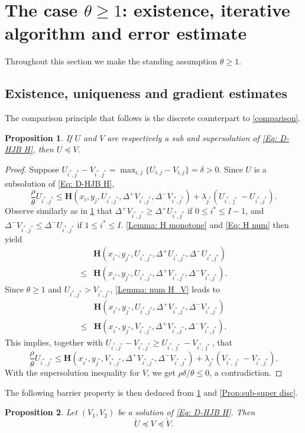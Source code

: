 \documentclass[11pt]{article}
\numberwithin{equation}{section}
\numberwithin{algorithm}{section}
\newtheorem{proposition}[proposition]{Proposition}
\newcommand{\lc}{\left(}
\newcommand{\rc}{\right)}
\newcommand{\beq}{\begin{equation}}
\newcommand{\eeq}{\end{equation}}
\theoremstyle{plain}
\newcommand{\D}{\Delta}
\begin{document}
\section{The case $\theta \geq 1$: existence, iterative algorithm and error estimate}\label{Sec: late}
Throughout this section we make the standing assumption $\theta \geq 1$.
\subsection{Existence, uniqueness and gradient estimates}
The comparison principle that follows is the discrete counterpart to \cref{comparison}. 
\begin{proposition}\label{Prop: comparison}
If ${U}$ and ${V}$ are respectively a sub and supersolution of \cref{Eq: D-HJB H}, then ${U}\preceq  {V}$.
\end{proposition}
\begin{proof} Suppose 
$
{U}_{i^*,j^*}-{V}_{i^*,j^*}=\max_{i,j}\{{U}_{i,j}-{V}_{i,j}\}=\delta>0.
$
Since ${U}$ is a subsolution of \cref{Eq: D-HJB H},
\beq
\frac{\rho}{\theta} {U}_{i^*,j^*}\leq \boldsymbol{H}\lc x_i,y_j,{U}_{i^*,j^*},\D^+{{V}_{i^*,j^*}},\D^-{{V}_{i^*,j^*}}\rc+\lambda_{j^*}({U}_{i^*,\bar \jmath^*}-{U}_{i^*,j^*}).
\eeq
Observe similarly as in \cref{Prop: comparison} that $\D^+{{V}_{i^*,j^*}}\geq \D^+{{U}_{i^*,j^*}}$ if $0\leq i^*\leq I-1$, and $\D^-{{V}_{i^*,j^*}}\leq \D^-{{U}_{i^*,j^*}}$ if $1\leq i^*\leq I$. \cref{Lemma: H monotone} and \cref{Eq: H num} then yield
$$
\begin{aligned}
&\boldsymbol{H}\lc x_{i^*},y_{j^*},{U}_{i^*,j^*},\D^+{{U}_{i^*,j^*}},\D^-{{U}_{i^*,j^*}}\rc\\
\leq {}&\boldsymbol{H}\lc x_{i^*},y_{j^*},{U}_{i^*,j^*},\D^+{{V}_{i^*,j^*}},\D^-{{V}_{i^*,j^*}}\rc.
\end{aligned}
$$
Since $\theta \geq 1$ and ${U}_{i^*,j^*}>{V}_{i^*,j^*}$, \cref{Lemma: num H_V} leads to 
\beq\label{Eq: HU HV}
\begin{aligned}
&\boldsymbol{H}\lc x_{i^*},y_{j^*},{U}_{i^*,j^*},\D^+{{V}_{i^*,j^*}},\D^-{{V}_{i^*,j^*}}\rc\\
\leq {}&\boldsymbol{H}\lc x_{i^*},y_{j^*},{V}_{i^*,j^*},\D^+{{V}_{i^*,j^*}},\D^-{{V}_{i^*,j^*}}\rc.
\end{aligned}
\eeq
This implies, together with ${U}_{i^*,j^*}-{V}_{i^*,j^*}\geq {U}_{i^*,\bar \jmath^*}-{V}_{i^*,\bar \jmath^*}$, that
\beq
\frac{\rho}{\theta} {U}_{i^*,j^*}\leq \boldsymbol{H}\lc x_{i^*},y_{j^*},{V}_{i^*,j^*},\D^+{{V}_{i^*,j^*}},\D^-{{V}_{i^*,j^*}}\rc+\lambda_{j^*}({V}_{i^*,\bar \jmath^*}-{V}_{i^*,j^*}).
\eeq 
With the supersolution inequality for ${V}$, we get $\rho \delta/\theta\leq 0$, a contradiction. 
\end{proof}
The following barrier property is then deduced from \cref{Prop: comparison} and \cref{Prop:sub-super disc}. 
\begin{proposition}\label{Prop: sol bound late}
Let $(V_1,V_2)$ be a solution of \cref{Eq: D-HJB H}. Then 
\beq\label{Eq: sol bound}
\check{U}\preceq  V\preceq  \check{V}.
\eeq
\end{proposition}
\end{document}
